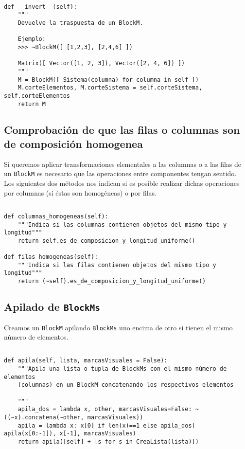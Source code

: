 \documentclass[11pt]{report}
\begin{document}
\begin{verbatim}

def __invert__(self):
    """
    Devuelve la traspuesta de un BlockM.
    
    Ejemplo:
    >>> ~BlockM([ [1,2,3], [2,4,6] ])
    
    Matrix([ Vector([1, 2, 3]), Vector([2, 4, 6]) ])
    """
    M = BlockM([ Sistema(columna) for columna in self ])
    M.corteElementos, M.corteSistema = self.corteSistema, self.corteElementos
    return M

\end{verbatim}

\subsection{Comprobación de que las filas o columnas son de composición homogenea}
\label{sec:org2f80313}

Si queremos aplicar transformaciones elementales a las columnas o a
las filas de un \texttt{BlockM} es necesario que las operaciones entre
componentes tengan sentido. Los siguientes dos métodos nos indican si
es posible realizar dichas operaciones por columnas (si éstas son
homogéneas) o por filas.
\begin{verbatim}

def columnas_homogeneas(self):
    """Indica si las columnas contienen objetos del mismo tipo y longitud"""
    return self.es_de_composicion_y_longitud_uniforme()

def filas_homogeneas(self):
    """Indica si las filas contienen objetos del mismo tipo y longitud"""
    return (~self).es_de_composicion_y_longitud_uniforme()

\end{verbatim}

\subsection{Apilado de \texttt{BlockMs}}
\label{sec:org9c757ff}

Creamos un \texttt{BlockM} apilando \texttt{BlockMs} uno encima de otro si tienen el
mismo número de elementos.
\begin{verbatim}

def apila(self, lista, marcasVisuales = False):
    """Apila una lista o tupla de BlockMs con el mismo número de elementos
    (columnas) en un BlockM concatenando los respectivos elementos

    """
    apila_dos = lambda x, other, marcasVisuales=False: ~((~x).concatena(~other, marcasVisuales))
    apila = lambda x: x[0] if len(x)==1 else apila_dos( apila(x[0:-1]), x[-1], marcasVisuales)
    return apila([self] + [s for s in CreaLista(lista)])

\end{verbatim}
\end{document}
